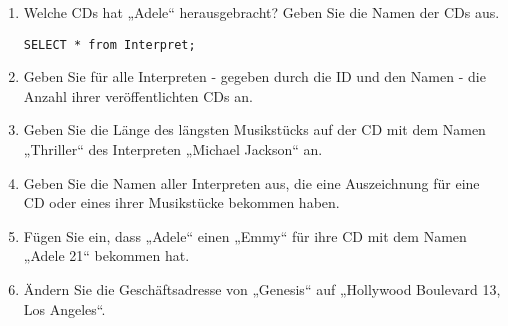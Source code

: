 \documentclass{lehramt-informatik-aufgabe}
\begin{document}
\begin{enumerate}


\item Welche CDs hat „Adele“ herausgebracht? Geben Sie die Namen der CDs
aus.

\begin{verbatim}
SELECT * from Interpret;
\end{verbatim}


\item Geben Sie für alle Interpreten - gegeben durch die ID und den
Namen - die Anzahl ihrer veröffentlichten CDs an.


\item Geben Sie die Länge des längsten Musikstücks auf der CD mit dem
Namen „Thriller“ des Interpreten „Michael Jackson“ an.


\item Geben Sie die Namen aller Interpreten aus, die eine Auszeichnung
für eine CD oder eines ihrer Musikstücke bekommen haben.


\item Fügen Sie ein, dass „Adele“ einen „Emmy“ für ihre CD mit dem Namen
„Adele 21“ bekommen hat.


\item Ändern Sie die Geschäftsadresse von „Genesis“ auf „Hollywood
Boulevard 13, Los Angeles“.

\end{enumerate}
\end{document}
